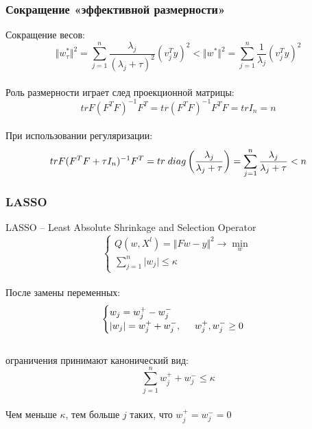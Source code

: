 \documentclass[12pt]{beamer}
\begin{document}
\begin{frame}\frametitle{Сокращение «эффективной размерности»}
Сокращение весов:\\
$$\Vert w_{\tau}^* \Vert^2 = \sum\limits_{j=1}^n \frac{\lambda_j}{(\lambda_j + \tau)^2} (v^T_j y)^2 < \Vert w^* \Vert^2  = \sum\limits_{j=1}^n \frac{1}{\lambda_j} (v_j^Ty)^2$$\\
Роль размерности играет след проекционной матрицы:\\
$$tr F(F^TF)^{-1}F^T = tr(F^TF)^{-1}F^TF = tr I_n = n$$\\
При использовании регуляризации:\\
$$tr F(F^TF + \tau I_n)^{-1}F^T = tr \hspace{1mm}  diag\left(\frac{\lambda_j}{\lambda_j + \tau}\right)= \sum\limits_{j=1}^n \frac{\lambda_j}{\lambda_j + \tau } < n $$
\end{frame}

\begin{frame}\frametitle{LASSO}
LASSO -- Least Absolute Shrinkage and Selection Operator\\
$$
\begin{cases} Q(w,X^l) = \Vert Fw - y \Vert^2 \rightarrow \min\limits_{w} \\
\sum_{j=1}^n \vert w_j \vert \leq \kappa
\end{cases}
$$\\
После замены переменных:\\
$$
\begin{cases} w_j = w_j^+ - w_j^-\\
\vert w_j \vert = w_j^+ + w_j^-, \hspace{5mm} w_j^+, w_j^- \geq 0\\

\end{cases}
$$\\
ограничения принимают канонический вид:\\
$$\sum\limits_{j=1}^n w_j^+ + w_j^- \leq \kappa$$\\
Чем меньше $\kappa$, тем больше $j$ таких, что $w_j^+ = w_j^- = 0$\\
\end{frame}
\end{document}
